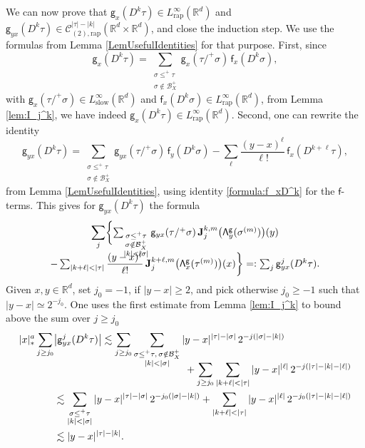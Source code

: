 \documentclass[JEP,XML,SOM,Unicode,published]{cedram}
\theoremstyle{plain}
\theoremstyle{definition}
\newcommand{\rap}{\mathrm{rap}}
\newcommand{\slow}{\mathrm{slow}}
\newcommand{\bfJ}{\mathbf{J}}
\newcommand{\sff}{\mathsf{f}}
\newcommand{\sfg}{\mathsf{g}}
\newcommand{\bbR}{\mathbb{R}}
\newcommand{\mcB}{\mathcal{B}}
\newcommand{\mcC}{\mathcal{C}}
\begin{document}
We can now prove that $\sfg_x(D^k\tau)\in L_\rap^\infty(\bbR^d)$ and ${\sfg}_{yx}(D^k\tau)\in\mcC^{|\tau|-|k|}_{(2),\rap}(\bbR^d\times\bbR^d)$, and close the induction step. We use the formulas from Lemma \ref{LemUsefulIdentities} for that purpose. First, since
\[
\sfg_x(D^k\tau) = \sum_{\substack{\sigma\leq^+\tau\\\sigma\notin\mcB_X^+}} \sfg_x(\tau/^+\sigma)\,\sff_x(D^k\sigma),
\]
with $\sfg_x(\tau/^+\sigma)\in L_\slow^\infty(\bbR^d)$ and $\sff_x(D^k\sigma)\in L_\rap^\infty(\bbR^d)$, from Lemma \ref{lem:I_j^k}, we have indeed $\sfg_x(D^k\tau)\in L_\rap^\infty(\bbR^d)$. Second, one can rewrite the identity
\[
\sfg_{yx}(D^k\tau) = \sum_{\substack{\sigma\leq^+\tau\\\sigma\notin\mcB_X^+}} \sfg_{yx}(\tau/^+\sigma)\,\sff_y(D^k\sigma) - \sum_{\ell}\frac{(y-x)^\ell}{\ell!}\,\sff_x(D^{k+\ell}\tau),
\]
from Lemma \ref{LemUsefulIdentities}, using identity \eqref{formula:f_xD^k} for the $\sff$-terms. This gives for $\sfg_{yx}(D^k\tau)$ the formula
\begin{multline*}
\sum_j
\biggl\{
\textstyle\sum_{\substack{\sigma\le^+\tau\\ \sigma\notin\mcB_X^+\\|k|<|\sigma|}} \sfg_{yx}(\tau/^+\sigma)\,\bfJ_j^{k,m}\bigl({\sf\Lambda}^{\sfg}_y(\sigma^{(m)})\bigr)(y)\\[-10pt]
\textstyle - \sum_{|k+\ell|<|\tau|}\dfrac{(y-x)^\ell}{\ell!}\,\bfJ_j^{k+\ell, m}\bigl({\sf\Lambda}^{\sfg}_x(\tau^{(m)})\bigr)(x)
\biggr\}=: \sum_j\sfg_{yx}^j(D^k\tau).
\end{multline*}
Given $x,y\in\bbR^d$, set $j_0=-1$, if $|y-x|\ge2$, and pick otherwise $j_0\ge-1$ such that $|y-x|\simeq2^{-j_0}$. One uses the first estimate from Lemma \ref{lem:I_j^k} to bound above the sum over $j\ge j_0$
\begin{equation}
\begin{split} \label{EqEstimate}
|x|_*^a\sum_{j\ge j_0}&\big|\sfg_{yx}^j(D^k\tau)\big| \lesssim \sum_{j\ge j_0}\sum_{\substack{\sigma\le^+\tau,\,\sigma\notin\mcB_X^+\\|k|<|\sigma|}} |y-x|^{|\tau|-|\sigma|}\,2^{-j(|\sigma|-|k|)}\\[-10pt]
&\hspace*{4.6cm}+ \sum_{j\ge j_0}\sum_{|k+\ell|<|\tau|}|y-x|^{|\ell|}\,2^{-j(|\tau|-|k|-|\ell|)}\\
&\lesssim \sum_{\substack{\sigma\le^+\tau\\|k|<|\sigma|}} |y-x|^{|\tau|-|\sigma|}\,2^{-j_0(|\sigma|-|k|)} + \sum_{|k+\ell|<|\tau|}|y-x|^{|\ell|}\,2^{-j_0(|\tau|-|k|-|\ell|)} \\
&\lesssim|y-x|^{|\tau|-|k|}.
\end{split}
\end{equation}
\end{document}
